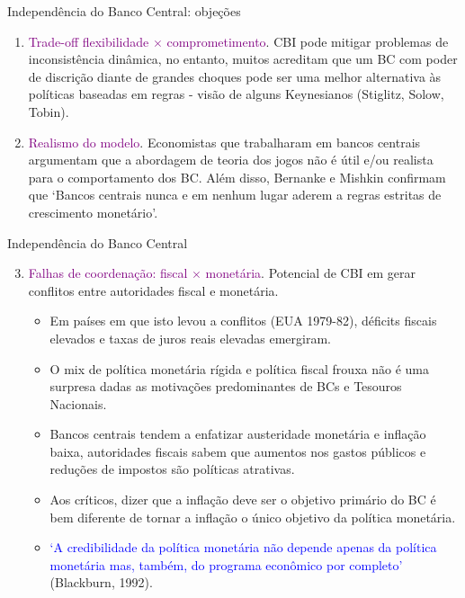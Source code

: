 \documentclass[10pt]{beamer}
\begin{document}
\begin{frame}{Independência do Banco Central: objeções}
    \begin{enumerate}
        \item \textcolor{purple}{Trade-off flexibilidade $\times$ comprometimento}. CBI pode mitigar problemas de inconsistência dinâmica, no entanto, muitos acreditam que um BC com poder de discrição diante de grandes choques pode ser uma melhor alternativa às políticas baseadas em regras - visão de alguns Keynesianos (Stiglitz, Solow, Tobin).
        \bigskip
        \item \textcolor{purple}{Realismo do modelo}. Economistas que trabalharam em bancos centrais argumentam que a abordagem de teoria dos jogos não é útil e/ou realista para o comportamento dos BC. Além disso, Bernanke e Mishkin confirmam que `Bancos centrais nunca e em nenhum lugar aderem a regras estritas de crescimento monetário'.
    \end{enumerate}
\end{frame}

\begin{frame}{Independência do Banco Central}
    \begin{enumerate}
        \setcounter{enumi}{2}
        \item \textcolor{purple}{Falhas de coordenação: fiscal $\times$ monetária}. Potencial de CBI em gerar conflitos entre autoridades fiscal e monetária.
        \bigskip
        \begin{itemize}
            \item Em países em que isto levou a conflitos (EUA 1979-82), déficits fiscais elevados e taxas de juros reais elevadas emergiram.
            \bigskip
            \item O mix de política monetária rígida e política fiscal frouxa não é uma surpresa dadas as motivações predominantes de BCs e Tesouros Nacionais.
            \bigskip
            \item Bancos centrais tendem a enfatizar austeridade monetária e inflação baixa, autoridades fiscais sabem que aumentos nos gastos públicos e reduções de impostos são políticas atrativas.
            \bigskip
            \item Aos críticos, dizer que a inflação deve ser o objetivo primário do BC é bem diferente de tornar a inflação o único objetivo da política monetária.
            \bigskip
            \item \textcolor{blue}{`A credibilidade da política monetária não depende apenas da política monetária mas, também, do programa econômico por completo'} (Blackburn, 1992).
        \end{itemize}
    \end{enumerate}
\end{frame}
\end{document}
